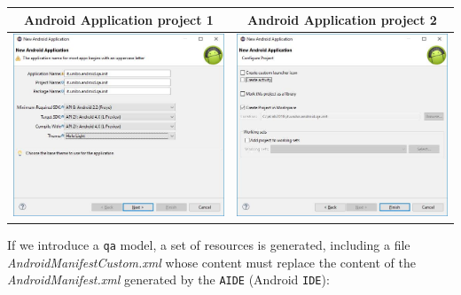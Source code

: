 \medskip   
\begin{tabular}{|c|c|}
\hline 
Android Application project 1 & Android Application project 2 \\ 
\hline 
\includegraphics[scale = 0.45]{./img/qainitAndroid0.jpg}
  &  \includegraphics[scale = 0.45]{./img/qainitAndroid1.jpg} \\
\hline 
\end{tabular} 
\medskip 

If we introduce a \texttt{qa} model, a set of resources is generated, including a file \textit{AndroidManifestCustom.xml} whose content must replace the content of the \textit{AndroidManifest.xml} generated by the \texttt{AIDE} (Android \texttt{IDE}):

